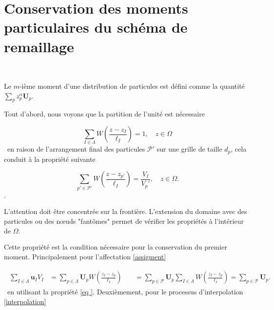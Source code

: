 
\appendix
\section{Conservation des moments particulaires du schéma de remaillage}~\label{appendix:moment_conservation}

Le $m$-ième moment d'une distribution de particules est défini comme la quantité $\sum_{p} z_p^{\alpha} \bm{U}_p$.

Tout d'abord, nous voyons que la partition de l'unité est nécessaire

\begin{equation}~\label{eq
    }
    \sum_{I \in \Lambda} W\left(\frac{z - z_I}{\ell_I}\right) = 1 ,\quad z \in \Omega
\end{equation}~en raison de l'arrangement final des particules $\mathcal{P'}$ sur une grille de taille $d_p$, cela conduit à la propriété suivante

\begin{equation}~\label{eq
    }
    \sum_{p'\in\mathcal P'} W\left(\frac{z - z_{p'}}{\ell_I}\right) = \frac{V_I}{V_p'},\quad z \in \Omega.
\end{equation}.

L'attention doit être concentrée sur la frontière. L'extension du domaine avec des particules ou des nœuds "fantômes" permet de vérifier les propriétés à l'intérieur de $\Omega$.

Cette propriété est la condition nécessaire pour la conservation du premier moment. Principalement pour l'affectation \ref{assigment}

\begin{gather}
    \begin{align*}
        \sum_{I \in \Lambda} \bm u_I V_I & = \sum_{p \in \Lambda} \bm U_p W \left(\frac{z_I - z_p}{\ell_I} \right)                                                            & \
                                         & = \sum_{p \in \mathcal P} \bm U_p \sum_{I \in \Lambda} W \left(\frac{z_I - z_p}{\ell_I} \right) = \sum_{p \in \mathcal P} \bm U_p. &
    \end{align*}
\end{gather}~en utilisant la propriété \eqref{eq
}. Deuxièmement, pour le processus d'interpolation \ref{interpolation}

